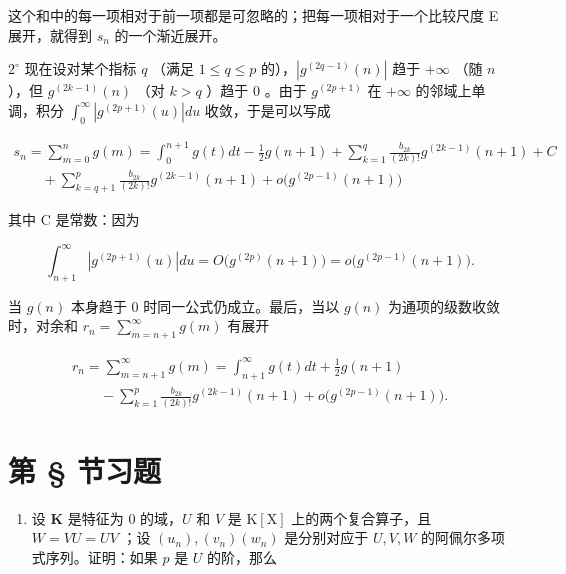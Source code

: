 这个和中的每一项相对于前一项都是可忽略的；把每一项相对于一个比较尺度 E 展开，就得到 \(s_{n}\) 的一个渐近展开。

\(2^{\circ}\) 现在设对某个指标 \(q\) （满足 \(1 \leqslant q \leqslant p\) 的），\(\left|g^{(2q-1)}(n)\right|\) 趋于 \(+\infty\) （随 \(n\) ），但 \(g^{(2k-1)}(n)\) （对 \(k > q\) ）趋于 0 。由于 \(g^{(2p+1)}\) 在 \(+\infty\) 的邻域上单调，积分 \(\int_0^\infty \left|g^{(2p+1)}(u)\right| du\) 收敛，于是可以写成

\[
\begin{array}{l} s _ {n} = \sum_ {m = 0} ^ {n} g (m) = \int_ {0} ^ {n + 1} g (t) d t - \frac {1}{2} g (n + 1) + \sum_ {k = 1} ^ {q} \frac {b _ {2 k}}{(2 k) !} g ^ {(2 k - 1)} (n + 1) + C \\ \qquad + \sum_ {k = q + 1} ^ {p} \frac {b _ {2 k}}{(2 k) !} g ^ {(2 k - 1)} (n + 1) + o \big (g ^ {(2 p - 1)} (n + 1) \big) \end{array}
\]

其中 C 是常数：因为

\[
\int_ {n + 1} ^ {\infty} \left| g ^ {(2 p + 1)} (u) \right| d u = O \big (g ^ {(2 p)} (n + 1) \big) = o \big (g ^ {(2 p - 1)} (n + 1) \big).
\]

当 \(g(n)\) 本身趋于 0 时同一公式仍成立。最后，当以 \(g(n)\) 为通项的级数收敛时，对余和 \(r_n = \sum_{m=n+1}^{\infty} g(m)\) 有展开

\[
\begin{array}{l} r _ {n} = \sum_ {m = n + 1} ^ {\infty} g (m) = \int_ {n + 1} ^ {\infty} g (t) d t + \frac {1}{2} g (n + 1) \\ \qquad - \sum_ {k = 1} ^ {p} \frac {b _ {2 k}}{(2 k) !} g ^ {(2 k - 1)} (n + 1) + o \big (g ^ {(2 p - 1)} (n + 1) \big). \end{array}
\]

\setcounter{exercisegroup}{0}
\section*{第 \S{} 节习题}
{}

\begin{enumerate}
\def\labelenumi{\arabic{enumi})}
\tightlist
\item
  设 \(\mathbf{K}\) 是特征为 0 的域，\(U\) 和 \(V\) 是 \(\mathrm{K}[\mathrm{X}]\) 上的两个复合算子，且 \(W = VU = UV\) ；设 \((u_n), (v_n)(w_n)\) 是分别对应于 \(U, V, W\) 的阿佩尔多项式序列。证明：如果 \(p\) 是 \(U\) 的阶，那么
\end{enumerate}

